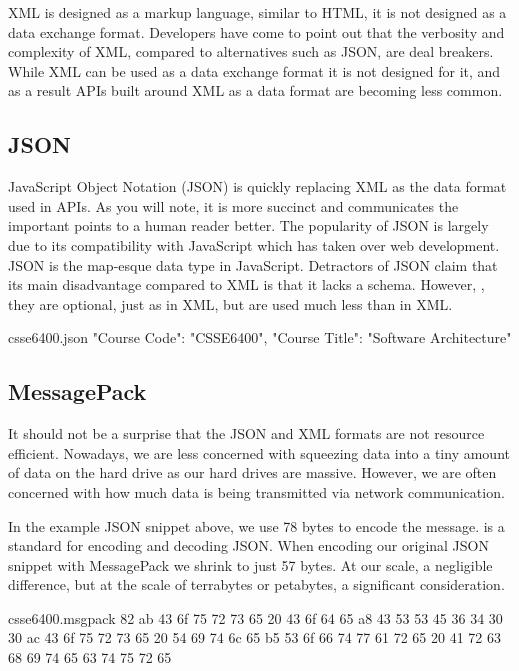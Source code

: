 \documentclass{csse4400}
\begin{document}
XML is designed as a markup language, similar to HTML,
it is not designed as a data exchange format.
Developers have come to point out that the verbosity and complexity of XML,
compared to alternatives such as JSON, are deal breakers.
While XML can be used as a data exchange format it is not designed for it,
and as a result APIs built around XML as a data format are becoming less common.

\subsection{JSON}
JavaScript Object Notation (JSON) is quickly replacing XML as the data format used in APIs.
As you will note, it is more succinct and communicates the important points to a human reader better.
The popularity of JSON is largely due to its compatibility with JavaScript which has taken over web development.
JSON is the map-esque data type in JavaScript.
Detractors of JSON claim that its main disadvantage compared to XML is that it lacks a schema.
However, ,
they are optional, just as in XML, but are used much less than in XML.

\begin{code}[language=json]{csse6400.json}
{
    "Course Code": "CSSE6400",
    "Course Title": "Software Architecture"
}
\end{code}

\subsection{MessagePack}
It should not be a surprise that the JSON and XML formats are not resource efficient.
Nowadays, we are less concerned with squeezing data into a tiny amount of data on the hard drive as our hard drives are massive.
However, we are often concerned with how much data is being transmitted via network communication.

In the example JSON snippet above, we use 78 bytes to encode the message.
 is a standard for encoding and decoding JSON.
When encoding our original JSON snippet with MessagePack we shrink to just 57 bytes.
At our scale, a negligible difference,
but at the scale of terrabytes or petabytes,
a significant consideration.

\begin{code}[]{csse6400.msgpack}
82 ab 43 6f 75 72 73 65 20 43 6f 64 65 a8 43 53 53 45 36 34 30 30 ac 43 6f 75 72 73 65 20 54 69 74 6c 65 b5 53 6f 66 74 77 61 72 65 20 41 72 63 68 69 74 65 63 74 75 72 65
\end{code}
\end{document}
